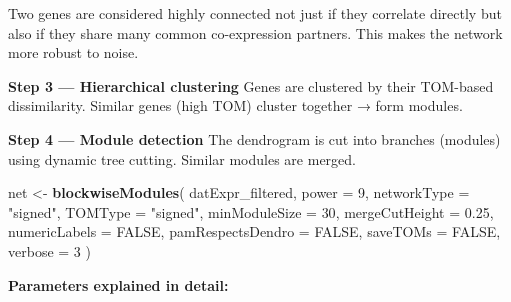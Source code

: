 \documentclass[
]{article}
\newenvironment{Shaded}{\begin{snugshade}}{\end{snugshade}}
\newcommand{\AttributeTok}[1]{\textcolor[rgb]{0.13,0.29,0.53}{#1}}
\newcommand{\ConstantTok}[1]{\textcolor[rgb]{0.56,0.35,0.01}{#1}}
\newcommand{\DecValTok}[1]{\textcolor[rgb]{0.00,0.00,0.81}{#1}}
\newcommand{\FloatTok}[1]{\textcolor[rgb]{0.00,0.00,0.81}{#1}}
\newcommand{\FunctionTok}[1]{\textcolor[rgb]{0.13,0.29,0.53}{\textbf{#1}}}
\newcommand{\NormalTok}[1]{#1}
\newcommand{\OtherTok}[1]{\textcolor[rgb]{0.56,0.35,0.01}{#1}}
\newcommand{\StringTok}[1]{\textcolor[rgb]{0.31,0.60,0.02}{#1}}
\begin{document}
Two genes are considered highly connected not just if they correlate
directly but also if they share many common co-expression partners. This
makes the network more robust to noise.

\textbf{Step 3 --- Hierarchical clustering} Genes are clustered by their
TOM-based dissimilarity. Similar genes (high TOM) cluster together →
form modules.

\textbf{Step 4 --- Module detection} The dendrogram is cut into branches
(modules) using dynamic tree cutting. Similar modules are merged.

\begin{Shaded}
\begin{Highlighting}[]
\NormalTok{net }\OtherTok{\textless{}{-}} \FunctionTok{blockwiseModules}\NormalTok{(}
\NormalTok{    datExpr\_filtered,}
    \AttributeTok{power             =} \DecValTok{9}\NormalTok{,}
    \AttributeTok{networkType       =} \StringTok{"signed"}\NormalTok{,}
    \AttributeTok{TOMType           =} \StringTok{"signed"}\NormalTok{,}
    \AttributeTok{minModuleSize     =} \DecValTok{30}\NormalTok{,}
    \AttributeTok{mergeCutHeight    =} \FloatTok{0.25}\NormalTok{,}
    \AttributeTok{numericLabels     =} \ConstantTok{FALSE}\NormalTok{,}
    \AttributeTok{pamRespectsDendro =} \ConstantTok{FALSE}\NormalTok{,}
    \AttributeTok{saveTOMs          =} \ConstantTok{FALSE}\NormalTok{,}
    \AttributeTok{verbose           =} \DecValTok{3}
\NormalTok{)}
\end{Highlighting}
\end{Shaded}

\textbf{Parameters explained in detail:}
\end{document}
